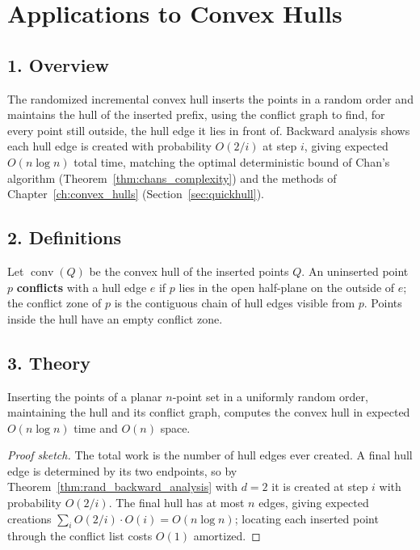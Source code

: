\section{Applications to Convex Hulls}
\label{sec:randomized_convex_hulls}

\subsection{1. Overview}

The randomized incremental convex hull inserts the points in a random order and
maintains the hull of the inserted prefix, using the conflict graph to find,
for every point still outside, the hull edge it lies in front of. Backward
analysis shows each hull edge is created with probability $O(2/i)$ at step $i$,
giving expected $O(n \log n)$ total time, matching the optimal deterministic
bound of Chan's algorithm (Theorem~\ref{thm:chans_complexity}) and the methods
of Chapter~\ref{ch:convex_hulls} (Section~\ref{sec:quickhull}).

\subsection{2. Definitions}

\begin{definition}\label{def:rand_hull_conflict}
  Let $\operatorname{conv}(Q)$ be the convex hull of the inserted points $Q$.
  An uninserted point $p$ \textbf{conflicts} with a hull edge $e$ if $p$ lies
  in the open half-plane on the outside of $e$; the conflict zone of $p$ is the
  contiguous chain of hull edges visible from $p$. Points inside the hull have
  an empty conflict zone.
\end{definition}

\subsection{3. Theory}

\begin{theorem}\label{thm:rand_hull_expected}
  Inserting the points of a planar $n$-point set in a uniformly random order,
  maintaining the hull and its conflict graph, computes the convex hull in
  expected $O(n \log n)$ time and $O(n)$ space.
\end{theorem}

\begin{proof}[Proof sketch]
  The total work is the number of hull edges ever created. A final hull edge is
  determined by its two endpoints, so by Theorem~\ref{thm:rand_backward_analysis}
  with $d = 2$ it is created at step $i$ with probability $O(2/i)$. The final
  hull has at most $n$ edges, giving expected creations $\sum_i O(2/i) \cdot
  O(i) = O(n \log n)$; locating each inserted point through the conflict list
  costs $O(1)$ amortized.
\end{proof}

